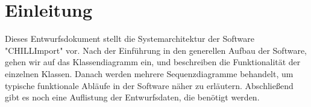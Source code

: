 \section{Einleitung}

Dieses Entwurfsdokument stellt die Systemarchitektur der Software "CHILLImport" vor.
Nach der Einführung in den generellen Aufbau der Software, gehen wir auf das Klassendiagramm ein, und beschreiben die Funktionalität der einzelnen Klassen.
Danach werden mehrere Sequenzdiagramme behandelt, um typische funktionale Abläufe in der Software näher zu erläutern.
Abschließend gibt es noch eine Auflistung der Entwurfsdaten, die benötigt werden.
